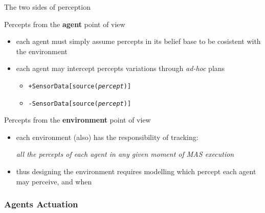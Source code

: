 \documentclass[presentation]{beamer}\mode<presentation>{\usetheme{AMSBolognaFC}}
\begin{document}
\begin{frame}[c]{The two sides of perception}
    
    \begin{block}{Percepts from the \textbf{agent} point of view}
        \begin{itemize}
            \item each agent must simply \alert{assume} percepts in its belief base to be \alert{cosistent} with the environment
            \item each agent may intercept percepts \alert{variations} through \textit{ad-hoc} plans
            \begin{itemize}
                \item[eg] \texttt{\alert{+}SensorData[source(\textit{percept})]}
                \item[eg] \texttt{\alert{-}SensorData[source(\textit{percept})]}
            \end{itemize}
        \end{itemize}
    \end{block}
    
    \vfill
    
    \begin{block}{Percepts from the \textbf{environment} point of view}
        \begin{itemize}
            \item each environment (also) has the \alert{responsibility} of tracking: 
            \begin{center}\small\itshape
                \alert{all} the percepts of \alert{each} agent in \alert{any} given moment of MAS execution
            \end{center}
            
            \item thus designing the environment requires modelling \alert{which} percept each agent may perceive, and \alert{when}
        \end{itemize}
    \end{block}
    
\end{frame} 

\subsubsection{Agents Actuation}
\end{document}
